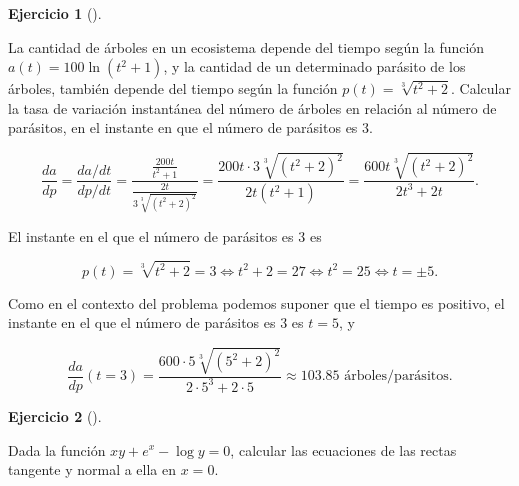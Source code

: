 \documentclass[
  a4paper,
]{scrreport}
\theoremstyle{definition}
\newtheorem{exercise}{Ejercicio}[chapter]
\theoremstyle{remark}
\begin{document}
\begin{exercise}[]\protect\hypertarget{exr-derivadas-parametricas-1}{}\label{exr-derivadas-parametricas-1}

La cantidad de árboles en un ecosistema depende del tiempo según la
función \(a(t)=100\ln(t^2+1)\), y la cantidad de un determinado parásito
de los árboles, también depende del tiempo según la función
\(p(t) = \sqrt[3]{t^2+ 2}\). Calcular la tasa de variación instantánea
del número de árboles en relación al número de parásitos, en el instante
en que el número de parásitos es \(3\).

\end{exercise}

\begin{tcolorbox}[enhanced jigsaw, coltitle=black, toptitle=1mm, colframe=quarto-callout-tip-color-frame, colbacktitle=quarto-callout-tip-color!10!white, breakable, opacityback=0, bottomtitle=1mm, opacitybacktitle=0.6, title=\textcolor{quarto-callout-tip-color}{\faLightbulb}\hspace{0.5em}{Solución}, arc=.35mm, leftrule=.75mm, toprule=.15mm, titlerule=0mm, bottomrule=.15mm, left=2mm, rightrule=.15mm, colback=white]

\[
\frac{da}{dp} = \frac{da/dt}{dp/dt} = \frac{\frac{200t}{t^2+1}}{\frac{2t}{3\sqrt[3]{(t^2+2)^2}}} = \frac{200t\cdot 3\sqrt[3]{(t^2+2)^2}}{2t(t^2+1)} = \frac{600t\sqrt[3]{(t^2+2)^2}}{2t^3+2t}.
\]

El instante en el que el número de parásitos es \(3\) es

\[
p(t)=\sqrt[3]{t^2+2} = 3 \Leftrightarrow t^2+2 = 27 \Leftrightarrow t^2=25 \Leftrightarrow t=\pm 5.
\]

Como en el contexto del problema podemos suponer que el tiempo es
positivo, el instante en el que el número de parásitos es \(3\) es
\(t=5\), y

\[
\frac{da}{dp} (t=3) = \frac{600\cdot 5\sqrt[3]{(5^2+2)^2}}{2\cdot 5^3+2\cdot 5} \approx 103.85 \mbox{ árboles/parásitos}.
\]

\end{tcolorbox}

\begin{exercise}[]\protect\hypertarget{exr-derivada-implicita-1}{}\label{exr-derivada-implicita-1}

Dada la función \(xy+e^x-\log y=0\), calcular las ecuaciones de las
rectas tangente y normal a ella en \(x=0\).

\end{exercise}
\end{document}
